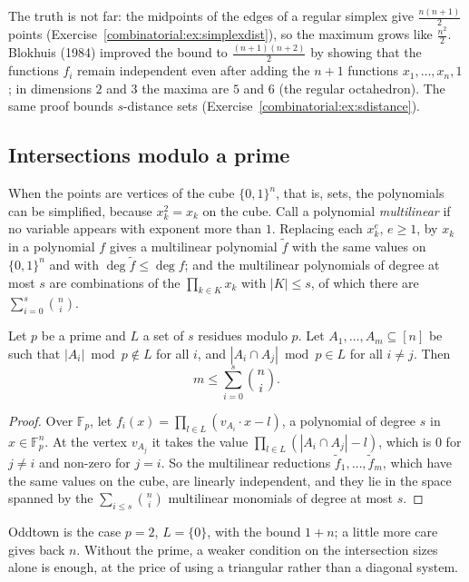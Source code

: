 The truth is not far: the midpoints of the edges of a regular simplex give $\frac{n(n+1)}2$ points (Exercise~\ref{combinatorial:ex:simplexdist}), so the maximum grows like $\frac{n^2}2$. Blokhuis (1984) improved the bound to
$\frac{(n+1)(n+2)}2$ by showing that the functions $f_i$ remain independent even after adding the $n+1$ functions $x_1,\dots,x_n,1$; in dimensions $2$ and $3$ the maxima are $5$ and $6$ (the regular octahedron).
The same proof bounds $s$-distance sets (Exercise~\ref{combinatorial:ex:sdistance}).

\subsection*{Intersections modulo a prime}

When the points are vertices of the cube $\{0,1\}^n$, that is, sets, the polynomials can be simplified, because $x_k^2=x_k$ on the cube. Call a polynomial \emph{multilinear} if no variable appears with
exponent more than $1$. Replacing each $x_k^e$, $e\ge1$, by $x_k$ in a polynomial $f$ gives a multilinear polynomial $\tilde f$ with the same values on $\{0,1\}^n$ and with $\deg\tilde f\le\deg f$; and the
multilinear polynomials of degree at most $s$ are combinations of the $\prod_{k\in K}x_k$ with $|K|\le s$, of which there are $\sum_{i=0}^s\binom ni$.

\begin{theorem}\label{combinatorial:thm:fwmod}
Let $p$ be a prime and $L$ a set of $s$ residues modulo $p$. Let $A_1,\dots,A_m\subseteq[n]$ be such that $|A_i|\bmod p\notin L$ for all $i$, and $|A_i\cap A_j|\bmod p\in L$ for all $i\ne j$. Then
\[
m\le\sum_{i=0}^s\binom ni.
\]
\end{theorem}
\begin{proof}
Over $\mathbb F_p$, let $f_i(x)=\prod_{l\in L}(v_{A_i}\cdot x-l)$, a polynomial of degree $s$ in $x\in\mathbb F_p^n$. At the vertex $v_{A_j}$ it takes the value $\prod_{l\in L}(|A_i\cap A_j|-l)$, which is $0$ for $j\ne i$ and non-zero for
$j=i$. So the multilinear reductions $\tilde f_1,\dots,\tilde f_m$, which have the same values on the cube, are linearly independent, and they lie in the space spanned by the $\sum_{i\le s}\binom ni$
multilinear monomials of degree at most $s$.
\end{proof}

Oddtown is the case $p=2$, $L=\{0\}$, with the bound $1+n$; a little more care gives back $n$. Without the prime, a weaker condition on the intersection sizes alone is enough, at the price of using a triangular
rather than a diagonal system.


